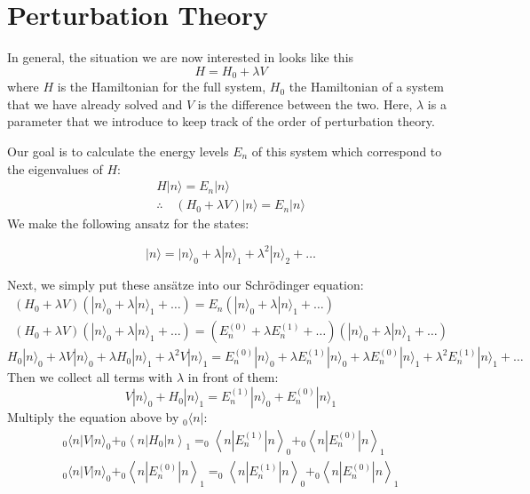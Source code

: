 \section{Perturbation Theory}
In general, the situation we are now interested in looks like this
$$
H=H_{0}+\lambda V
$$
where $H$ is the Hamiltonian for the full system, $H_{0}$ the Hamiltonian of a system that we have already solved and $V$ is the difference between the two. Here, $\lambda$ is a parameter that we introduce to keep track of the order of perturbation theory.

Our goal is to calculate the energy levels $E_{n}$ of this system which correspond to the eigenvalues of $H:$
\[
\begin{array}{c}
{H|n\rangle= E_{n}|n\rangle} \\
{\therefore \quad\left(H_{0}+\lambda V\right)|n\rangle= E_{n}|n\rangle}
\end{array}
\]
We make the following ansatz for the states:
\begin{qt}
\begin{equation}
|n\rangle=|n\rangle_{0}+\lambda|n\rangle_{1}+\lambda^{2}|n\rangle_{2}+\ldots
\end{equation}
\end{qt}
Next, we simply put these ansätze into our Schrödinger equation:
$$
\begin{array}{l}
{\left(H_{0}+\lambda V\right)\left(|n\rangle_{0}+\lambda|n\rangle_{1}+\ldots\right)=E_{n}\left(|n\rangle_{0}+\lambda|n\rangle_{1}+\ldots\right)} \\
{\left(H_{0}+\lambda V\right)\left(|n\rangle_{0}+\lambda|n\rangle_{1}+\ldots\right)=\left(E_{n}^{(0)}+\lambda E_{n}^{(1)}+\ldots\right)\left(|n\rangle_{0}+\lambda|n\rangle_{1}+\ldots\right)}
\end{array}
$$
$$
H_{0}|n\rangle_{0}+\lambda V|n\rangle_{0}+\lambda H_{0}|n\rangle_{1}+\lambda^{2} V|n\rangle_{1}=E_{n}^{(0)}|n\rangle_{0}+\lambda E_{n}^{(1)}|n\rangle_{0}+\lambda E_{n}^{(0)}|n\rangle_{1}+\lambda^{2} E_{n}^{(1)}|n\rangle_{1}+\dots
$$
Then we collect all terms with $\lambda$ in front of them:
\begin{equation}
V|n\rangle_{0}+H_{0}|n\rangle_{1}=E_{n}^{(1)}|n\rangle_{0}+E_{n}^{(0)}|n\rangle_{1}
\end{equation}
Multiply the equation above by $_{0}\langle n|:$
$$
\begin{array}{c}
{_{0}\langle n|V| n\rangle_{0}+_{0}\left\langle n\left|H_{0}\right| n\right\rangle_{1}=_{0}\left\langle n\left|E_{n}^{(1)}\right| n\right\rangle_{0}+_{0}\left\langle n\left|E_{n}^{(0)}\right| n\right\rangle_{1}} \\
{_{0}\langle n|V| n\rangle_{0}+_{0}\left\langle n\left|E_{n}^{(0)}\right| n\right\rangle_{1}=_{0}\left\langle n\left|E_{n}^{(1)}\right| n\right\rangle_{0}+_{0}\left\langle n\left|E_{n}^{(0)}\right| n\right\rangle_{1}}\\
\end{array}
$$
